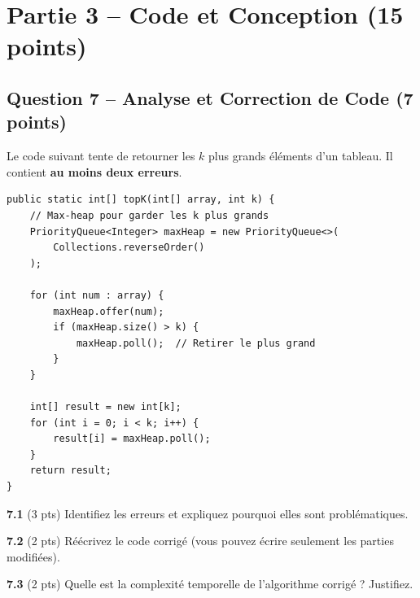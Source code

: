 \documentclass[11pt,letterpaper]{article}
\begin{document}
\newpage

\section*{Partie 3 -- Code et Conception (15 points)}

\subsection*{Question 7 -- Analyse et Correction de Code (7 points)}

Le code suivant tente de retourner les $k$ plus grands éléments d'un tableau. Il contient \textbf{au moins deux erreurs}.

\begin{lstlisting}[style=java]
public static int[] topK(int[] array, int k) {
    // Max-heap pour garder les k plus grands
    PriorityQueue<Integer> maxHeap = new PriorityQueue<>(
        Collections.reverseOrder()
    );

    for (int num : array) {
        maxHeap.offer(num);
        if (maxHeap.size() > k) {
            maxHeap.poll();  // Retirer le plus grand
        }
    }

    int[] result = new int[k];
    for (int i = 0; i < k; i++) {
        result[i] = maxHeap.poll();
    }
    return result;
}
\end{lstlisting}

\vspace{0.5em}

\textbf{7.1} (3 pts) Identifiez les erreurs et expliquez pourquoi elles sont problématiques.

\vspace{6cm}

\textbf{7.2} (2 pts) Réécrivez le code corrigé (vous pouvez écrire seulement les parties modifiées).

\vspace{5cm}

\textbf{7.3} (2 pts) Quelle est la complexité temporelle de l'algorithme corrigé ? Justifiez.

\vspace{4cm}
\end{document}
